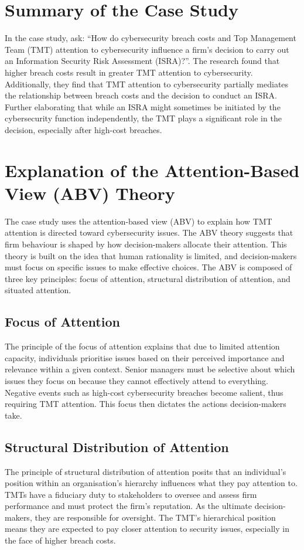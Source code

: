 \section{Summary of the Case Study}
In the case study, \citet{shaikh2023information} ask: ``How do cybersecurity breach costs and Top Management Team (TMT) attention to cybersecurity influence a firm's decision to carry out an Information Security Risk Assessment (ISRA)?''. The research found that higher breach costs result in greater TMT attention to cybersecurity. Additionally, they find that TMT attention to cybersecurity partially mediates the relationship between breach costs and the decision to conduct an ISRA. Further elaborating that while an ISRA might sometimes be initiated by the cybersecurity function independently, the TMT plays a significant role in the decision, especially after high-cost breaches.

\section{Explanation of the Attention-Based View (ABV) Theory}
The case study uses the attention-based view (ABV) to explain how TMT attention is directed toward cybersecurity issues. The ABV theory suggests that firm behaviour is shaped by how decision-makers allocate their attention. This theory is built on the idea that human rationality is limited, and decision-makers must focus on specific issues to make effective choices. The ABV is composed of three key principles: focus of attention, structural distribution of attention, and situated attention.

    \subsection{Focus of Attention}
    The principle of the focus of attention explains that due to limited attention capacity, individuals prioritise issues based on their perceived importance and relevance within a given context. Senior managers must be selective about which issues they focus on because they cannot effectively attend to everything. Negative events such as high-cost cybersecurity breaches become salient, thus requiring TMT attention. This focus then dictates the actions decision-makers take.

    \subsection{Structural Distribution of Attention}
    The principle of structural distribution of attention posits that an individual's position within an organisation's hierarchy influences what they pay attention to. TMTs have a fiduciary duty to stakeholders to oversee and assess firm performance and must protect the firm's reputation. As the ultimate decision-makers, they are responsible for oversight. The TMT's hierarchical position means they are expected to pay closer attention to security issues, especially in the face of higher breach costs.

